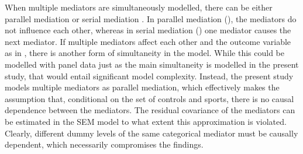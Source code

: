 When multiple mediators are simultaneously modelled, there can be either parallel mediation or serial mediation \cite{hayes2017introduction}.
In parallel mediation (), the mediators do not influence each other,
whereas in serial mediation () one mediator causes the next mediator.
If multiple mediators affect each other and the outcome variable as in ,
there is another form of simultaneity in the model. While this could be modelled with panel data just as the main
simultaneity is modelled in the present study, that would entail significant model complexity.
Instead, the present study models multiple mediators as parallel mediation, which effectively makes the assumption that,
conditional on the set of controls and sports, there is no causal dependence between the mediators.
The residual covariance of the mediators can be estimated in the SEM model to what extent this approximation is violated.
Clearly, different dummy levels of the same categorical mediator must be causally dependent, which necessarily
compromises the findings.

